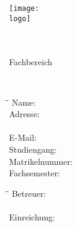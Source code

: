 \pagestyle{empty}

\begin{minipage}{2cm}
	\vspace{-1.7cm}
	\texttt{[image: \\logo]}
\end{minipage}
\begin{minipage}{13.25cm}
	\vspace{-1.5cm}
		\begin{flushright}
			\large{
				\textbf{\institution}\\
				\zusatz\\
				Fachbereich \fachbereich
			}
	\end{flushright}
\end{minipage}

\vspace{4\baselineskip}

\begin{center}
	\Huge{\textbf{\art}}
\end{center}

\vspace{1\baselineskip}

\begin{center}
	\LARGE{\titel}\\
	\Large{\untertitel}
\end{center}

\vspace{4\baselineskip}

\begin{tabbing}
	\hspace*{3.5cm}\=\hspace{5cm}\=\kill
		Name: \>\autor\\
		Adresse: \>\strasse\\
		\>\ort\\
		E-Mail: \>\email\\
		Studiengang: \>\studiengang\\
		Matrikelnummer: \>\matrikelnummer\\
		Fachsemester: \>\fachsemester
\end{tabbing}

\vspace{3\baselineskip}

\begin{tabbing}
	\hspace*{3.5cm}\=\hspace{5cm}\=\kill
		Betreuer: \>\betreuer\\
		\\
		Einreichung: \>\einreichungsdatum
\end{tabbing}